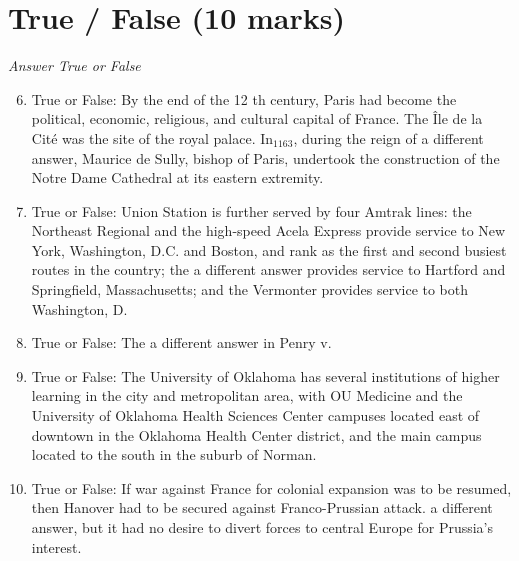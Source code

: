 \documentclass[12pt]{article}
\begin{document}
\section*{True / False (10 marks)}
\textit{Answer True or False}
\begin{enumerate}[label=\arabic*.]
\setcounter{enumi}{5}
\item True or False: By the end of the 12 th century, Paris had become the political, economic, religious, and cultural capital of France. The Île de la Cité was the site of the royal palace. In$_{1163}$, during the reign of a different answer, Maurice de Sully, bishop of Paris, undertook the construction of the Notre Dame Cathedral at its eastern extremity.
\item True or False: Union Station is further served by four Amtrak lines: the Northeast Regional and the high-speed Acela Express provide service to New York, Washington, D.C. and Boston, and rank as the first and second busiest routes in the country; the a different answer provides service to Hartford and Springfield, Massachusetts; and the Vermonter provides service to both Washington, D.
\item True or False: The a different answer in Penry v.
\item True or False: The University of Oklahoma has several institutions of higher learning in the city and metropolitan area, with OU Medicine and the University of Oklahoma Health Sciences Center campuses located east of downtown in the Oklahoma Health Center district, and the main campus located to the south in the suburb of Norman.
\item True or False: If war against France for colonial expansion was to be resumed, then Hanover had to be secured against Franco-Prussian attack. a different answer, but it had no desire to divert forces to central Europe for Prussia's interest.
\end{enumerate}
\end{document}
